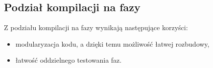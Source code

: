 \documentclass{documentation}
\begin{document}
\pagebreak
\subsection{Podział kompilacji na fazy}
\noindent Z podziału kompilacji na fazy wynikają następujące korzyści:
\begin{itemize}
    \item modularyzacja kodu, a dzięki temu możliwość łatwej rozbudowy,
    \item łatwość oddzielnego testowania faz.
\end{itemize}
\end{document}
